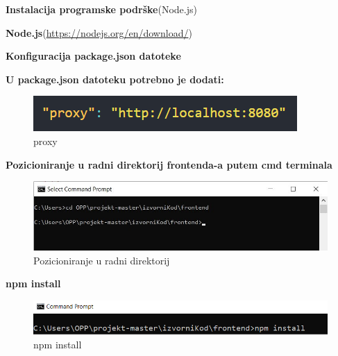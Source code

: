 		   	\noindent {}
		   		\begin{packed_enum}
				
					\item \textbf{Instalacija programske podrške}(Node.js)
    					\begin{packed_item}
                			\item \textbf{Node.js}(\url{https://nodejs.org/en/download/})
                		
    		      \end{packed_item}
					\item \textbf{Konfiguracija package.json datoteke}
					\begin{packed_item}
                			\item \textbf{U package.json datoteku potrebno je dodati: }
                		
    		      \end{packed_item}
					
    					\begin{figure}[H]
    					\includegraphics[scale=1]{slike/backend/proxy.png}
    					\centering
    					\caption{proxy}
    					\label{fig:proxy}
    		            \end{figure}
    		            
    		  \item \textbf{Pozicioniranje u radni direktorij frontenda-a putem cmd terminala}
    		            \begin{figure}[H]
    					\includegraphics[scale=1]{slike/frontend/prva.jpg}
    					\centering
    					\caption{Pozicioniranje u radni direktorij}
    					\label{fig:pozicioniranje2}
    		            \end{figure}
    		            
    		 \item \textbf{npm install}
    		            \begin{figure}[H]
    					\includegraphics[scale=0.9]{slike/frontend/treca.png}
    					\centering
    					\caption{npm install}
    					\label{fig:npm install}
    		            \end{figure}
    		            

\end{packed_enum}
